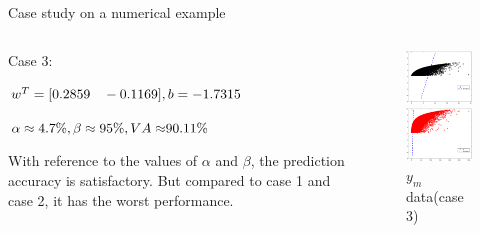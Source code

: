 \documentclass[10pt]{beamer}
\begin{document}
\begin{frame}{Case study on a numerical example}
 \begin{columns}
             \begin{column}{0.5\textwidth}
   Case 3: \par
     $\small{w^T = [0.2859 \quad -0.1169]
 , b =-1.7315 } $\par $\small{\alpha  \approx 4.7\%,\beta  \approx 95 \% ,VA \approx}90.11 \% $ \par 
 With reference to the values of $\alpha$ and $\beta$, the prediction accuracy is satisfactory. But compared to case 1 and case 2, it has the worst performance.
           \end{column}
        \begin{column}{0.4\textwidth}  %
   \begin{figure}
        \centering
        \includegraphics[width=4cm]{fig/EAandhyper.eps}
        \caption{$y_n$ data(case 3)}
        \includegraphics[width=4cm]{fig/EMandhyper.eps}
        \caption{ $y_{m}$ data(case 3)}
        \end{figure}
        \end{column}
    \end{columns}    
\end{frame}
\end{document}
